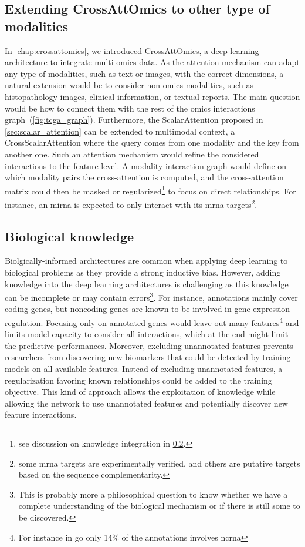 \documentclass[../main.tex]{subfiles}
\begin{document}
	\subsection{Extending CrossAttOmics to other type of modalities}
		In \cref{chap:crossattomics}, we introduced CrossAttOmics, a deep learning architecture to integrate multi-omics data.
		As the attention mechanism can adapt any type of modalities, such as text or images, with the correct dimensions, a natural extension would be to consider non-omics modalities, such as histopathology images, clinical information, or textual reports.
		The main question would be how to connect them with the rest of the omics interactions graph~(\cref{fig:tcga_graph}).
		Furthermore, the ScalarAttention proposed in \cref{sec:scalar_attention} can be extended to multimodal context, \ie{}a CrossScalarAttention where the query comes from one modality and the key from another one.
		Such an attention mechanism would refine the considered interactions to the feature level.
		A modality interaction graph would define on which modality pairs the cross-attention is computed, and the cross-attention matrix could then be masked or regularized\footnote{see discussion on knowledge integration in \cref{sec:persp_knwoledged}.} to focus on direct relationships.
		For instance, an \gls{mirna} is expected to only interact with its \gls{mrna} targets\footnote{some \gls{mrna} targets are experimentally verified, and others are putative targets based on the sequence complementarity.}.

	\subsection{Biological knowledge}\label{sec:persp_knwoledged}
		Biolgically-informed architectures are common when applying deep learning to biological problems as they provide a strong inductive bias.
		However, adding knowledge into the deep learning architectures is challenging as this knowledge can be incomplete or may contain errors\footnote{This is probably more a philosophical question to know whether we have a complete understanding of the biological mechanism or if there is still some to be discovered.}.
		For instance, annotations mainly cover coding genes, but noncoding genes are known to be involved in gene expression regulation.
		Focusing only on annotated genes would leave out many features\footnote{For instance in \gls{go} only 14\% of the annotations involves \gls{ncrna}} and limits model capacity to consider all interactions, which at the end might limit the predictive performances.
		Moreover, excluding unannotated features prevents researchers from discovering new biomarkers that could be detected by training models on all available features.
		Instead of excluding unannotated features, a regularization favoring known relationships could be added to the training objective.
		This kind of approach allows the exploitation of knowledge while allowing the network to use unannotated features and potentially discover new feature interactions.
\end{document}
